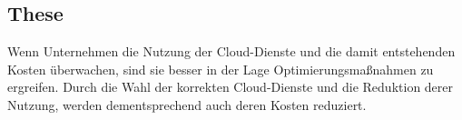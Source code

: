 \subsection{These}
Wenn Unternehmen die Nutzung der Cloud-Dienste und die damit entstehenden Kosten überwachen, sind sie besser in der Lage Optimierungsmaßnahmen zu ergreifen. Durch die Wahl der korrekten Cloud-Dienste und die Reduktion derer Nutzung, werden dementsprechend auch deren Kosten reduziert. 

\begin{comment}
\subsection*{Einschränkungen}
\addcontentsline{toc}{subsection}{Einschränkungen}

Der Schwerpunkt dieser Arbeit liegt auf EC2-Instanzen, da diese in der Regel den größten Anteil an der Rechnung ausmachen.
An zweiter Stelle stehen S3-Speichereinheiten, weil sie einen erheblichen Teil der Kosten darstellen.

{\cite{AMZ08,AMZ09}} 
\\
Diese Arbeit legt den Fokus auf die Optimierung der oben genannten Dienste.
Als Überwachungswerkzeuge für die Kosten werden die AWS CloudWatch, der AWS Cost-Explorer und der AWS Trusted Advisor untersucht. 
\end{comment}
\newpage
